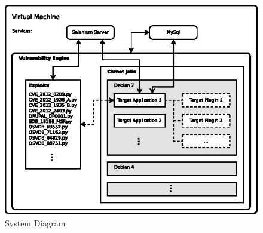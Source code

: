\documentclass[letterpaper,twocolumn,10pt]{article}
\begin{document}
\begin{figure}[!tp]
\begin{center}
\includegraphics[scale=1.17]{system_diagram.eps}
\end{center}
\caption{System Diagram}
\end{figure}
\end{document}

